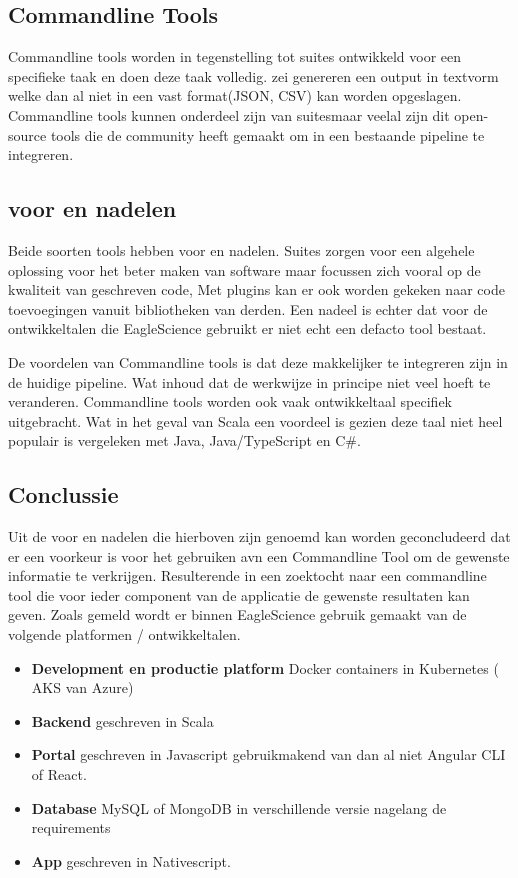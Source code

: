 \subsection{Commandline Tools}
Commandline tools worden in tegenstelling tot suites ontwikkeld voor een specifieke taak en doen deze taak volledig. zei genereren een output in textvorm welke dan al niet in een vast format(JSON, CSV) kan worden opgeslagen.
Commandline tools kunnen onderdeel zijn van suitesmaar veelal zijn dit open-source tools die de community heeft gemaakt om in een bestaande pipeline te integreren.



\subsection{voor en nadelen}
Beide soorten tools hebben voor en nadelen. Suites zorgen voor een algehele oplossing voor het beter maken van software maar focussen zich vooral op de kwaliteit van geschreven code, Met plugins kan er ook worden gekeken naar code toevoegingen vanuit bibliotheken van derden. Een nadeel is echter dat voor de ontwikkeltalen die EagleScience gebruikt er niet echt een defacto tool bestaat.

De voordelen van Commandline tools is dat deze makkelijker te integreren zijn in de huidige pipeline. Wat inhoud dat de werkwijze in principe niet veel hoeft te veranderen. Commandline tools worden ook vaak ontwikkeltaal specifiek uitgebracht. Wat in het geval van Scala een voordeel is gezien deze taal niet heel populair is vergeleken met Java, Java/TypeScript en C\#.


\subsection{Conclussie}
Uit de voor en nadelen die hierboven zijn genoemd kan worden geconcludeerd dat er een voorkeur is voor het gebruiken avn een Commandline Tool om de gewenste informatie te verkrijgen. Resulterende in een zoektocht naar een commandline tool die voor ieder component van de applicatie de gewenste resultaten kan geven. Zoals gemeld wordt er binnen EagleScience gebruik gemaakt van de volgende platformen / ontwikkeltalen.
\begin{itemize}
    \item \textbf{Development en productie platform} Docker containers in Kubernetes ( AKS van Azure)
    \item \textbf{Backend} geschreven in Scala
    \item \textbf{Portal} geschreven in Javascript gebruikmakend van dan al niet Angular CLI of React.
    \item \textbf{Database} MySQL of MongoDB in verschillende versie nagelang de requirements
    \item \textbf{App} geschreven in Nativescript.
\end{itemize}


